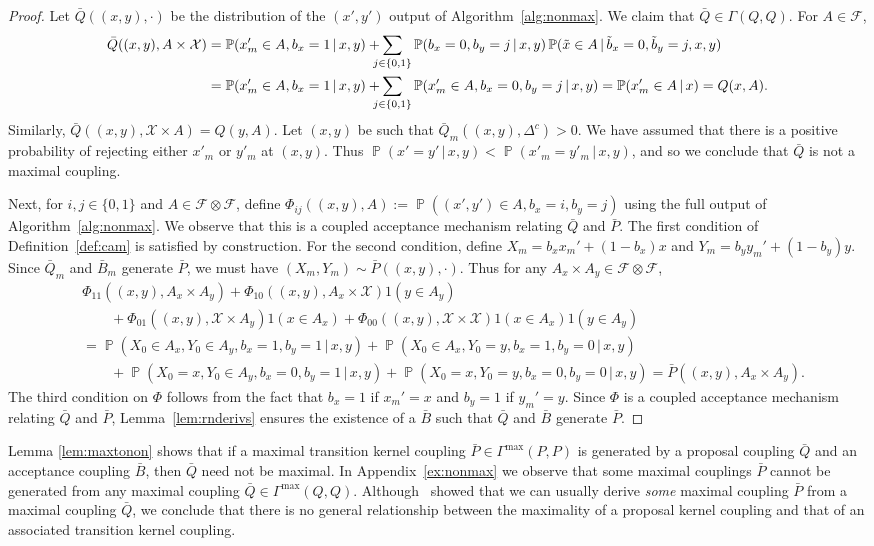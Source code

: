 \documentclass[aihp]{imsart}
\theoremstyle{plain}
\theoremstyle{remark}
\theoremstyle{definition} \newtheorem{example}{Example}
\newcommand{\eq}[1]{\begin{align*}#1\end{align*}} %
\renewcommand{\P}{\operatorname{\mathbb{P}}}
\newcommand{\scrF}{\mathscr{F}}
\newcommand{\calX}{\mathcal{X}}
\newcommand{\cd}{\cdot}
\newcommand{\g}{\, | \,}
\newcommand{\scrFp}{\scrF \otimes \scrF}
\newcommand{\bp}{\bar P}
\newcommand{\bq}{\bar Q}
\newcommand{\bb}{\bar B}
\newcommand{\xy}{(x,y)}
\newcommand{\xyp}{(x',y')}
\newcommand{\axy}{A_x \times A_y}
\newcommand{\Gmax}{\Gamma^\mathrm{max}}
\begin{document}
\begin{proof}
Let $\bq(\xy,\cd)$ be the distribution of the $\xyp$ output of Algorithm~\ref{alg:nonmax}.
We claim that $\bq \in \Gamma(Q,Q)$. For $A \in \scrF$,
\eq{
	\bq(\xy, A \times \calX)
	& = \P(x_m' \in A, b_x=1 \g x,y) + \hspace{-7pt} \sum_{j \in \{0,1\} } \P(b_x=0, b_y=j \g x,y) \P(\tilde x \in A \g \tilde b_x=0, \tilde b_y=j, x,y) \\
	& = \P(x_m' \in A, b_x=1 \g x,y) + \hspace{-7pt} \sum_{j \in \{0,1\} } \P(x_m' \in A, b_x=0, b_y=j \g x,y)
	= \P(x'_m \in A \g x) = Q(x,A).
}
Similarly, $\bq(\xy, \calX \times A) = Q(y,A)$. Let $\xy$ be such that $\bq_m(\xy, \Delta^c) > 0$.
We have assumed that there is a positive probability of rejecting either $x'_m$ or $y'_m$ at $\xy$.
Thus $\P(x' = y' \g x,y) < \P(x'_m = y'_m \g x,y)$, and so we conclude that $\bq$ is not a maximal
coupling.

Next, for $i,j \in \{0,1\}$ and $A \in \scrFp$, define $\Phi_{ij}(\xy, A) := \P((x',y') \in A, b_x =
i, b_y=j)$ using the full output of Algorithm~\ref{alg:nonmax}. We observe that this is a coupled
acceptance mechanism relating $\bq$ and $\bp$. The first condition of Definition~\ref{def:cam} is
satisfied by construction. For the second condition, define $X_m = b_x x_m' + (1-b_x) x$ and $Y_m =
b_y y_m' + (1-b_y) y$. Since $\bq_m$ and $\bb_m$ generate $\bp$, we must have $(X_m, Y_m) \sim
\bp(\xy,\cd)$. Thus for any $\axy \in \scrFp$,
\eq{
	&  \Phi_{11}(\xy, \axy) + \Phi_{10}(\xy, A_x \times \calX) 1(y \in A_y)  \\
	& \qquad + \Phi_{01}(\xy, \calX \times A_y) 1(x \in A_x)
	+ \Phi_{00}(\xy, \calX \times \calX) 1(x \in A_x) 1(y \in A_y) \\
	& = \P( X_0 \in A_x, Y_0 \in A_y, b_x = 1, b_y=1 \g x,y)
	+ \P( X_0 \in A_x, Y_0 = y, b_x = 1, b_y=0 \g x,y) \\
	& \qquad + \P( X_0 = x, Y_0 \in A_y, b_x = 0, b_y=1 \g x,y)
	+ \P( X_0 = x ,Y_0 = y, b_x = 0, b_y=0 \g x,y)
	= \bp(\xy, \axy).
}
The third condition on $\Phi$ follows from the fact that $b_x = 1$ if $x_m'=x$ and $b_y = 1$ if
$y_m'=y$. Since $\Phi$ is a coupled acceptance mechanism relating $\bq$ and $\bp$,
Lemma~\ref{lem:rnderivs} ensures the existence of a $\bb$ such that $\bq$ and $\bb$ generate $\bp$.
\end{proof}

Lemma \ref{lem:maxtonon} shows that if a maximal transition kernel coupling $\bp \in \Gmax(P,P)$ is
generated by a proposal coupling $\bq$ and an acceptance coupling $\bb$, then $\bq$ need not be
maximal. In Appendix~\ref{ex:nonmax} we observe that some maximal couplings $\bp$ cannot be
generated from any maximal coupling $\bq \in \Gmax(Q,Q)$. Although~\citet{OLeary2020} showed that we
can usually derive \textit{some} maximal coupling $\bp$ from a maximal coupling $\bq$, we conclude
that there is no general relationship between the maximality of a proposal kernel coupling and
that of an associated transition kernel coupling.
\end{document}
